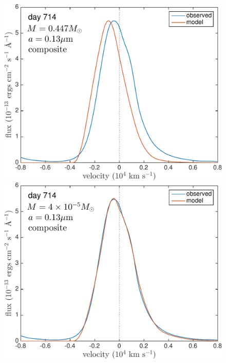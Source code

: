 \begin{figure}
\centering
\includegraphics[trim =0 20 0 0,clip=true,scale=0.35]{chapters/chapter5/images/silicates_take2/composite_Dwek_Ha.pdf}
\hspace{3mm}
\includegraphics[trim =0 20 0 -10,clip=true,scale=0.35]{chapters/chapter5/images/silicates_take2/composite_bestfit_Ha.pdf}


\end{figure}
